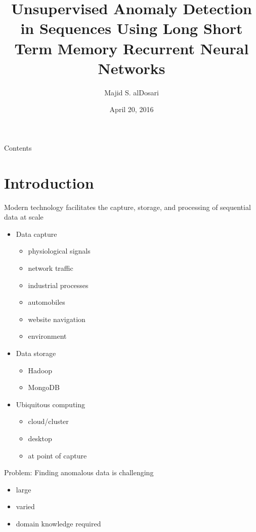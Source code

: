 \documentclass{beamer}
\title{Unsupervised Anomaly Detection in Sequences
Using Long Short Term Memory Recurrent Neural Networks}
\date{April 20, 2016} %
\author{Majid S. alDosari}
\institute{George Mason University}
\begin{document}
  \maketitle

  \begin{frame}[allowframebreaks]{Contents}
    \tableofcontents 
  \end{frame}

  \section{Introduction}

  \begin{frame}{Modern technology facilitates the 
      capture, storage, and processing of sequential data at scale}

    \begin{itemize}
    \item Data capture
      \begin{itemize}
      \item physiological signals
      \item network traffic
      \item industrial processes
      \item automobiles
      \item website navigation
      \item environment
      \end{itemize}
    \item Data storage
      \begin{itemize}
      \item Hadoop
      \item MongoDB
      \end{itemize}
    \item Ubiquitous computing
      \begin{itemize}
      \item cloud/cluster
      \item desktop
      \item at point of capture
      \end{itemize}
    \end{itemize}    


  \end{frame}


  \begin{frame}{Problem: Finding anomalous data is challenging}

    \begin{itemize}
    \item large 
    \item varied
    \item domain knowledge required
    \end{itemize}

  \end{frame}
\end{document}
